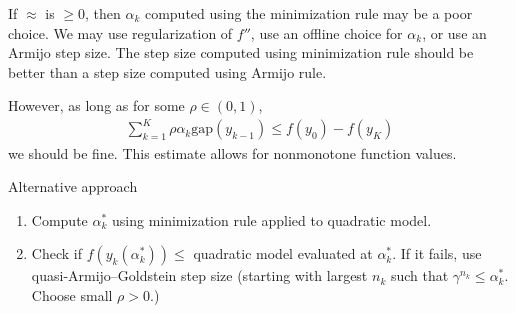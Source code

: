 \documentclass{scrartcl}
\begin{document}
	If $\approx$ is $\geq 0$, then $\alpha_k$ computed using 
	the minimization rule may be a poor choice. 
	We may use regularization of $f''$, use an offline choice
	for $\alpha_k$, or use an Armijo step size. 
	The step size computed using minimization rule should be better than 
	a step size computed using Armijo rule.
	

	However, as long as for some $\rho \in (0,1)$, 
	\begin{align*}
		\sum_{k=1}^K \rho \alpha_k \mathrm{gap}(y_{k-1})
		\leq f(y_0) - f(y_K)
	\end{align*}
	we should be fine. This estimate allows for nonmonotone
	function values.
	
	
	Alternative approach
	\begin{enumerate}
		\item Compute $\alpha_k^*$ using minimization rule applied
		to quadratic model.
		\item Check if 
		$f(y_k(\alpha_k^*)) \leq $
		quadratic model evaluated at 
		$\alpha_k^*$.
		If it fails, use  quasi-Armijo--Goldstein step size 
		(starting with largest
		$n_k$ such that $\gamma^{n_k} \leq \alpha_k^*$.
		Choose small $\rho > 0$.)
	\end{enumerate}
	
	
	
	
	
	
	
\end{document}
